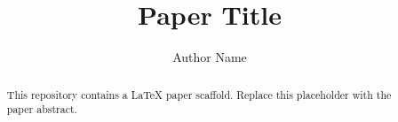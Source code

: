 \documentclass[11pt]{article}
\title{Paper Title}
\author{Author Name}
\date{}
\begin{document}
\maketitle

\begin{abstract}
This repository contains a LaTeX paper scaffold. Replace this placeholder with the paper abstract.
\end{abstract}









\end{document}
